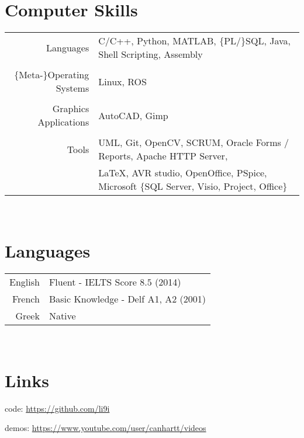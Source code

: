 \documentclass[a4paper,10pt,twoside]{article}
\begin{document}





\section{Computer Skills}

\begin{tabular}{rp{12cm}}
Languages & C/C++, Python, MATLAB, $\{$PL/$\}$SQL, Java, Shell Scripting, Assembly \\
&\\
$\{$Meta-$\}$Operating Systems & Linux, ROS \\
&\\
Graphics Applications & AutoCAD, Gimp\\
&\\
Tools & UML, Git, OpenCV, SCRUM, Oracle Forms / Reports, Apache HTTP Server,\\
  &\LaTeX, AVR studio, OpenOffice, PSpice, Microsoft $\{$SQL Server, Visio, Project, Office$\}$\\
\end{tabular} \\



\section{Languages}

\begin{tabular}{rp{13cm}}
English & Fluent - IELTS Score $8.5$ (2014)\\%
French & Basic Knowledge - Delf A1, A2 (2001) \\
Greek & Native
\end{tabular} \\



\section{Links}
code: \url{https://github.com/li9i}

demos: \url{https://www.youtube.com/user/canhartt/videos}
\end{document}
